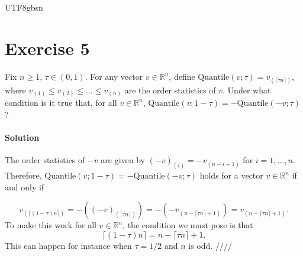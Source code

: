 \documentclass[../main.tex]{subfiles}
\begin{document}
\begin{CJK*}{UTF8}{gbsn}

\section*{Exercise 5}
Fix $n \geqslant 1$, $\tau \in (0,1)$.
For any vector $v \in \mathbb{R}^n$,
define $\text{Quantile}(v; \tau) = v_{(\lceil \tau n \rceil)}$,
where $v_{(1)} \leqslant v_{(2)} \leqslant \ldots \leqslant v_{(n)}$ are the order statistics of $v$.
Under what condition is it true that, for all $v \in \mathbb{R}^n$,
$\text{Quantile}(v; 1- \tau) = -\text{Quantile}(-v; \tau)$?

\paragraph{Solution}
The order statistics of $-v$ are given by $(-v)_{(i)} = -v_{(n-i+1)}$ for $i = 1, \ldots, n$.
Therefore, $\text{Quantile}(v; 1- \tau) = -\text{Quantile}(-v; \tau)$
holds
for a vector $v \in \mathbb{R}^n$
if and only if 

\begin{equation*}
  v_{(\lceil (1-\tau) n \rceil)} = -((-v)_{(\lceil \tau n \rceil)})
  = -(-v_{(n-\lceil \tau n \rceil + 1)})
  = v_{(n-\lceil \tau n \rceil + 1)}.
\end{equation*}
To make this work for all $v \in \mathbb{R}^n$, the condition we must pose is that
\begin{equation*}
\lceil (1-\tau) n \rceil = n-\lceil \tau n \rceil + 1.
\end{equation*}
This can happen for instance when $\tau = 1/2$ and $n$ is odd.
////
\end{CJK*}
\end{document}
